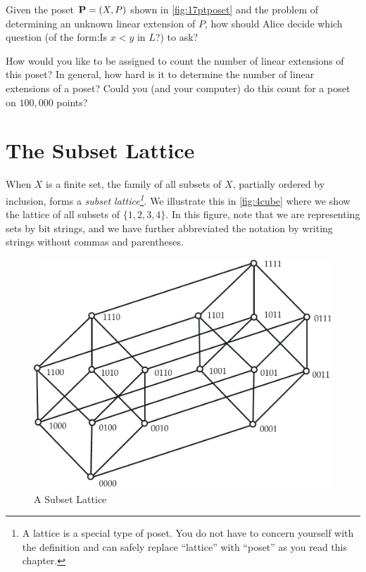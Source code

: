 \begin{remark}
Given the poset $\mathbf{P}=(X,P)$ shown in \autoref{fig:17ptposet} and the problem of 
determining an unknown linear extension of $P$, how should Alice decide 
which question (of the form:\quad Is $x<y$ in $L$?) to ask?  

How would you like to be assigned to count the
number of linear extensions of this poset?  In general, 
how hard is it to determine the number of linear extensions of a poset?
Could you (and your computer) do this count for a poset on $100,000$ points?
\end{remark}

\section{The Subset Lattice}\label{s:posets:subset-lattice}

When $X$ is a finite set, the family of all subsets of $X$, partially
ordered by inclusion, forms a
\textit{subset lattice\footnote{A lattice is a special type of
    poset. You do not have to concern yourself with the definition and
    can safely replace ``lattice'' with ``poset'' as you read this
    chapter.}}.  We illustrate this in \autoref{fig:4cube} where we
show the lattice of all subsets of $\{1,2,3,4\}$. In this figure, note
that we are representing sets by bit strings, and we have further
abbreviated the notation by writing strings without commas and
parentheses.

\begin{figure}
\begin{center}
\includegraphics*[scale=.4]{posets-figs/4cube.pdf}
\caption{A Subset Lattice}
\label{fig:4cube}
\end{center}
\end{figure}

